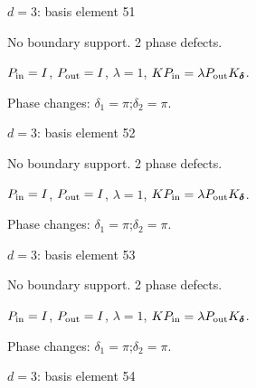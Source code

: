 \vfill
{\footnotesize\texttt{}}
\newpage
{}
{\Large $d=3$: basis element 51}\par
No boundary support. 2 phase defects.
\begin{center}
\end{center}
\vspace{-1mm}
$P_{\rm in}=I$, \quad $P_{\rm out}=I$, \quad $\lambda=1$, \qquad $K P_{\rm in}=\lambda P_{\rm out}K_{\boldsymbol\delta}$.
\par\smallskip\begin{minipage}{.98\linewidth}\small Phase changes: $\delta_{1}=\pi$;\quad $\delta_{2}=\pi$.\end{minipage}
\vfill
{\footnotesize\texttt{}}
\newpage
{}
{\Large $d=3$: basis element 52}\par
No boundary support. 2 phase defects.
\begin{center}
\end{center}
\vspace{-1mm}
$P_{\rm in}=I$, \quad $P_{\rm out}=I$, \quad $\lambda=1$, \qquad $K P_{\rm in}=\lambda P_{\rm out}K_{\boldsymbol\delta}$.
\par\smallskip\begin{minipage}{.98\linewidth}\small Phase changes: $\delta_{1}=\pi$;\quad $\delta_{2}=\pi$.\end{minipage}
\vfill
{\footnotesize\texttt{}}
\newpage
{}
{\Large $d=3$: basis element 53}\par
No boundary support. 2 phase defects.
\begin{center}
\end{center}
\vspace{-1mm}
$P_{\rm in}=I$, \quad $P_{\rm out}=I$, \quad $\lambda=1$, \qquad $K P_{\rm in}=\lambda P_{\rm out}K_{\boldsymbol\delta}$.
\par\smallskip\begin{minipage}{.98\linewidth}\small Phase changes: $\delta_{1}=\pi$;\quad $\delta_{2}=\pi$.\end{minipage}
\vfill
{\footnotesize\texttt{}}
\newpage
{}
{\Large $d=3$: basis element 54}\par
